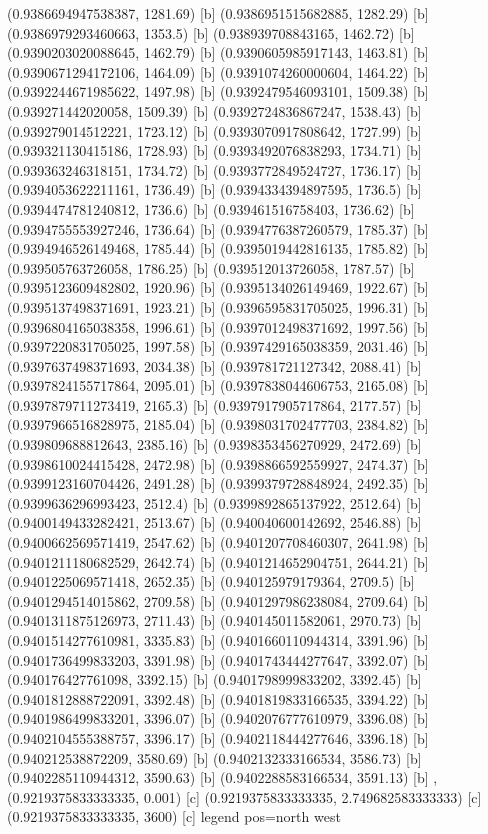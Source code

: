 {{{(0.9386694947538387, 1281.69) [b] 
(0.9386951515682885, 1282.29) [b] 
(0.9386979293460663, 1353.5) [b] 
(0.938939708843165, 1462.72) [b] 
(0.9390203020088645, 1462.79) [b] 
(0.9390605985917143, 1463.81) [b] 
(0.9390671294172106, 1464.09) [b] 
(0.9391074260000604, 1464.22) [b] 
(0.9392244671985622, 1497.98) [b] 
(0.9392479546093101, 1509.38) [b] 
(0.939271442020058, 1509.39) [b] 
(0.9392724836867247, 1538.43) [b] 
(0.939279014512221, 1723.12) [b] 
(0.9393070917808642, 1727.99) [b] 
(0.939321130415186, 1728.93) [b] 
(0.9393492076838293, 1734.71) [b] 
(0.939363246318151, 1734.72) [b] 
(0.9393772849524727, 1736.17) [b] 
(0.9394053622211161, 1736.49) [b] 
(0.9394334394897595, 1736.5) [b] 
(0.9394474781240812, 1736.6) [b] 
(0.939461516758403, 1736.62) [b] 
(0.9394755553927246, 1736.64) [b] 
(0.9394776387260579, 1785.37) [b] 
(0.9394946526149468, 1785.44) [b] 
(0.9395019442816135, 1785.82) [b] 
(0.939505763726058, 1786.25) [b] 
(0.939512013726058, 1787.57) [b] 
(0.9395123609482802, 1920.96) [b] 
(0.9395134026149469, 1922.67) [b] 
(0.9395137498371691, 1923.21) [b] 
(0.9396595831705025, 1996.31) [b] 
(0.9396804165038358, 1996.61) [b] 
(0.9397012498371692, 1997.56) [b] 
(0.9397220831705025, 1997.58) [b] 
(0.9397429165038359, 2031.46) [b] 
(0.9397637498371693, 2034.38) [b] 
(0.939781721127342, 2088.41) [b] 
(0.9397824155717864, 2095.01) [b] 
(0.9397838044606753, 2165.08) [b] 
(0.9397879711273419, 2165.3) [b] 
(0.9397917905717864, 2177.57) [b] 
(0.9397966516828975, 2185.04) [b] 
(0.9398031702477703, 2384.82) [b] 
(0.939809688812643, 2385.16) [b] 
(0.9398353456270929, 2472.69) [b] 
(0.9398610024415428, 2472.98) [b] 
(0.9398866592559927, 2474.37) [b] 
(0.9399123160704426, 2491.28) [b] 
(0.9399379728848924, 2492.35) [b] 
(0.9399636296993423, 2512.4) [b] 
(0.9399892865137922, 2512.64) [b] 
(0.9400149433282421, 2513.67) [b] 
(0.940040600142692, 2546.88) [b] 
(0.9400662569571419, 2547.62) [b] 
(0.9401207708460307, 2641.98) [b] 
(0.9401211180682529, 2642.74) [b] 
(0.9401214652904751, 2644.21) [b] 
(0.9401225069571418, 2652.35) [b] 
(0.940125979179364, 2709.5) [b] 
(0.9401294514015862, 2709.58) [b] 
(0.9401297986238084, 2709.64) [b] 
(0.9401311875126973, 2711.43) [b] 
(0.940145011582061, 2970.73) [b] 
(0.9401514277610981, 3335.83) [b] 
(0.9401660110944314, 3391.96) [b] 
(0.9401736499833203, 3391.98) [b] 
(0.9401743444277647, 3392.07) [b] 
(0.940176427761098, 3392.15) [b] 
(0.9401798999833202, 3392.45) [b] 
(0.9401812888722091, 3392.48) [b] 
(0.9401819833166535, 3394.22) [b] 
(0.9401986499833201, 3396.07) [b] 
(0.9402076777610979, 3396.08) [b] 
(0.9402104555388757, 3396.17) [b] 
(0.9402118444277646, 3396.18) [b] 
(0.940212538872209, 3580.69) [b] 
(0.9402132333166534, 3586.73) [b] 
(0.9402285110944312, 3590.63) [b] 
(0.9402288583166534, 3591.13) [b] 
},{(0.9219375833333335, 0.001) [c] 
(0.9219375833333335, 2.749682583333333) [c] 
(0.9219375833333335, 3600) [c] 
}}}{legend pos=north west}